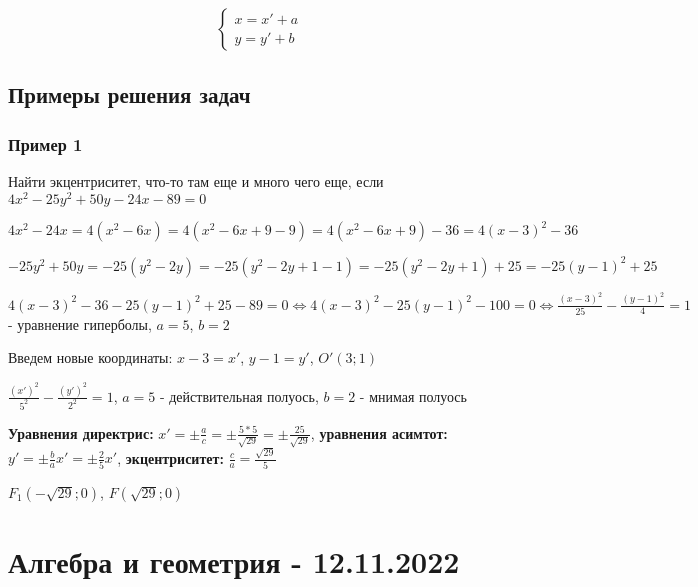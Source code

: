 \documentclass{article}
\begin{document}
\begin{equation}
    \begin{cases}
        x = x' + a \\
        y = y' + b
    \end{cases}
\end{equation}

\subsection{Примеры решения задач}

\subsubsection{Пример 1}

\begin{flushleft}

Найти экцентриситет, что-то там еще и много чего еще, если $4x^2 - 25y^2 + 50y - 24x - 89 = 0$

\hfill

$4x^2 - 24x = 4(x^2 - 6x) = 4 (x^2 - 6x + 9 - 9) = 4 (x^2 - 6x + 9) - 36 = 4 (x - 3)^2 - 36$

$-25y^2 + 50y = -25 (y^2 - 2y) = -25 (y^2 - 2y + 1 - 1) = -25 (y^2 - 2y + 1) + 25 = -25 (y - 1)^2 + 25$

\hfill

$4 (x - 3)^2 - 36 - 25 (y - 1)^2 + 25 - 89 = 0 \Longleftrightarrow 4 (x - 3)^2 - 25 (y - 1)^2 - 100 = 0 \Longleftrightarrow \frac{(x - 3)^2}{25} - \frac{(y - 1)^2}{4} = 1$ - уравнение гиперболы, $a = 5$, $b = 2$

\hfill

Введем новые координаты: $x - 3 = x'$, $y - 1 = y'$, $O'(3; 1)$

$\frac{(x')^2}{5^2} - \frac{(y')^2}{2^2} = 1$, $a = 5$ - действительная полуось, $b = 2$ - мнимая полуось

\hfill

\textbf{Уравнения директрис:} $x' = \pm \frac{a}{c} = \pm \frac{5 * 5}{\sqrt{29}} = \pm \frac{25}{\sqrt{29}}$, \textbf{уравнения асимтот:} $y' = \pm \frac{b}{a} x' = \pm \frac{2}{5} x'$, \textbf{экцентриситет:} $\frac{c}{a} = \frac{\sqrt{29}}{5}$

$F_1(-\sqrt{29}; 0)$, $F(\sqrt{29}; 0)$

\end{flushleft}

\pagebreak
\section{Алгебра и геометрия - 12.11.2022}
\end{document}

